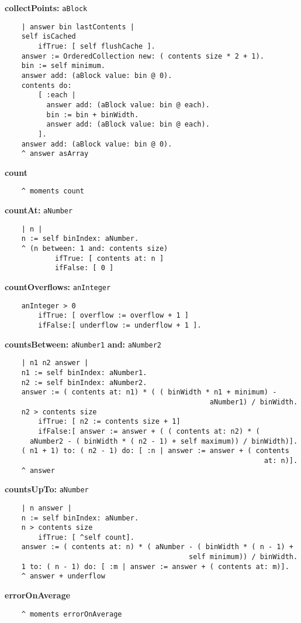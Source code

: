 {\bf collectPoints:} {\tt aBlock}
\begin{verbatim}
    | answer bin lastContents |
    self isCached
        ifTrue: [ self flushCache ].
    answer := OrderedCollection new: ( contents size * 2 + 1).
    bin := self minimum.
    answer add: (aBlock value: bin @ 0).
    contents do:
        [ :each |
          answer add: (aBlock value: bin @ each).
          bin := bin + binWidth.
          answer add: (aBlock value: bin @ each).
        ].
    answer add: (aBlock value: bin @ 0).
    ^ answer asArray
\end{verbatim}
{\bf count}
\begin{verbatim}
    ^ moments count
\end{verbatim}
{\bf countAt:} {\tt aNumber}
\begin{verbatim}
    | n |
    n := self binIndex: aNumber.
    ^ (n between: 1 and: contents size)
            ifTrue: [ contents at: n ]
            ifFalse: [ 0 ]
\end{verbatim}
{\bf countOverflows:} {\tt anInteger}
\begin{verbatim}
    anInteger > 0
        ifTrue: [ overflow := overflow + 1 ]
        ifFalse:[ underflow := underflow + 1 ].
\end{verbatim}
{\bf countsBetween:} {\tt aNumber1} {\bf and:} {\tt aNumber2}
\begin{verbatim}
    | n1 n2 answer |
    n1 := self binIndex: aNumber1.
    n2 := self binIndex: aNumber2.
    answer := ( contents at: n1) * ( ( binWidth * n1 + minimum) - 
                                                 aNumber1) / binWidth.
    n2 > contents size
        ifTrue: [ n2 := contents size + 1]
        ifFalse:[ answer := answer + ( ( contents at: n2) * ( 
      aNumber2 - ( binWidth * ( n2 - 1) + self maximum)) / binWidth)].
    ( n1 + 1) to: ( n2 - 1) do: [ :n | answer := answer + ( contents 
                                                              at: n)].
    ^ answer
\end{verbatim}
{\bf countsUpTo:} {\tt aNumber}
\begin{verbatim}
    | n answer |
    n := self binIndex: aNumber.
    n > contents size
        ifTrue: [ ^self count].
    answer := ( contents at: n) * ( aNumber - ( binWidth * ( n - 1) + 
                                            self minimum)) / binWidth.
    1 to: ( n - 1) do: [ :m | answer := answer + ( contents at: m)].
    ^ answer + underflow
\end{verbatim}
{\bf errorOnAverage}
\begin{verbatim}
    ^ moments errorOnAverage
\end{verbatim}
